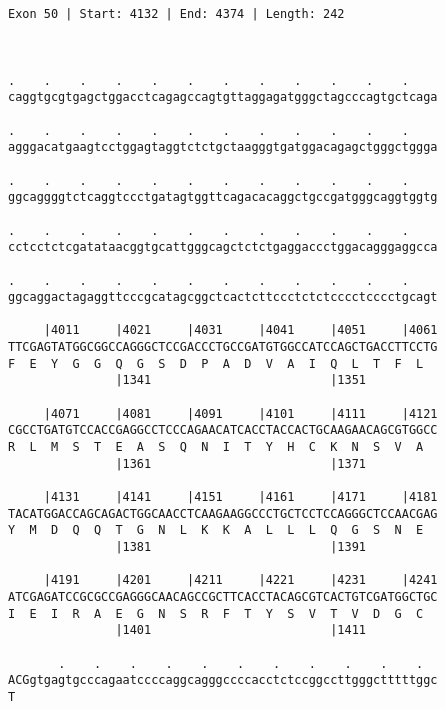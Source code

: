 \documentclass{article}
\begin{document}
\begin{Verbatim}
Exon 50 | Start: 4132 | End: 4374 | Length: 242



.    .    .    .    .    .    .    .    .    .    .    .    
caggtgcgtgagctggacctcagagccagtgttaggagatgggctagcccagtgctcaga
                                                            
.    .    .    .    .    .    .    .    .    .    .    .    
agggacatgaagtcctggagtaggtctctgctaagggtgatggacagagctgggctggga
                                                            
.    .    .    .    .    .    .    .    .    .    .    .    
ggcaggggtctcaggtccctgatagtggttcagacacaggctgccgatgggcaggtggtg
                                                            
.    .    .    .    .    .    .    .    .    .    .    .    
cctcctctcgatataacggtgcattgggcagctctctgaggaccctggacagggaggcca
                                                            
.    .    .    .    .    .    .    .    .    .    .    .    
ggcaggactagaggttcccgcatagcggctcactcttccctctctcccctcccctgcagt
                                                            
     |4011     |4021     |4031     |4041     |4051     |4061
TTCGAGTATGGCGGCCAGGGCTCCGACCCTGCCGATGTGGCCATCCAGCTGACCTTCCTG
F  E  Y  G  G  Q  G  S  D  P  A  D  V  A  I  Q  L  T  F  L  
               |1341                         |1351          
  
     |4071     |4081     |4091     |4101     |4111     |4121
CGCCTGATGTCCACCGAGGCCTCCCAGAACATCACCTACCACTGCAAGAACAGCGTGGCC
R  L  M  S  T  E  A  S  Q  N  I  T  Y  H  C  K  N  S  V  A  
               |1361                         |1371          
  
     |4131     |4141     |4151     |4161     |4171     |4181
TACATGGACCAGCAGACTGGCAACCTCAAGAAGGCCCTGCTCCTCCAGGGCTCCAACGAG
Y  M  D  Q  Q  T  G  N  L  K  K  A  L  L  L  Q  G  S  N  E  
               |1381                         |1391          
  
     |4191     |4201     |4211     |4221     |4231     |4241
ATCGAGATCCGCGCCGAGGGCAACAGCCGCTTCACCTACAGCGTCACTGTCGATGGCTGC
I  E  I  R  A  E  G  N  S  R  F  T  Y  S  V  T  V  D  G  C  
               |1401                         |1411          
  
       .    .    .    .    .    .    .    .    .    .    .  
ACGgtgagtgcccagaatccccaggcagggccccacctctccggccttgggctttttggc
T                                                           
                                                            

\end{Verbatim}
\end{document}
